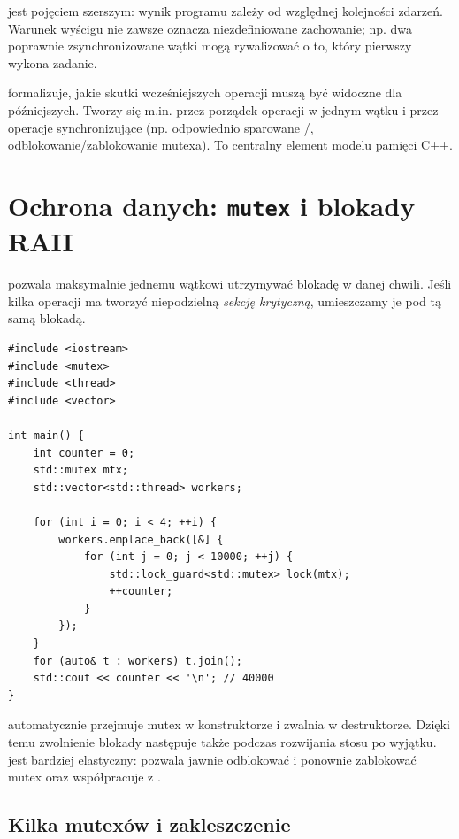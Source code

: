  jest pojęciem szerszym:
wynik programu zależy od względnej kolejności zdarzeń. Warunek wyścigu nie
zawsze oznacza niezdefiniowane zachowanie; np. dwa poprawnie zsynchronizowane
wątki mogą rywalizować o to, który pierwszy wykona zadanie.

 formalizuje, jakie skutki wcześniejszych
operacji muszą być widoczne dla późniejszych. Tworzy się m.in. przez porządek
operacji w jednym wątku i przez operacje synchronizujące (np. odpowiednio
sparowane /, odblokowanie/zablokowanie mutexa).
To centralny element modelu pamięci C++.

\section{Ochrona danych: \texttt{mutex} i blokady RAII}
\label{sec:mutex}

 pozwala maksymalnie jednemu wątkowi utrzymywać blokadę
w danej chwili. Jeśli kilka operacji ma tworzyć niepodzielną \emph{sekcję
krytyczną}, umieszczamy je pod tą samą blokadą.

\begin{lstlisting}[caption={Bezpieczny licznik przy użyciu mutexa (C++11).}]
#include <iostream>
#include <mutex>
#include <thread>
#include <vector>

int main() {
    int counter = 0;
    std::mutex mtx;
    std::vector<std::thread> workers;

    for (int i = 0; i < 4; ++i) {
        workers.emplace_back([&] {
            for (int j = 0; j < 10000; ++j) {
                std::lock_guard<std::mutex> lock(mtx);
                ++counter;
            }
        });
    }
    for (auto& t : workers) t.join();
    std::cout << counter << '\n'; // 40000
}
\end{lstlisting}

 automatycznie przejmuje mutex w konstruktorze i zwalnia
w destruktorze. Dzięki temu zwolnienie blokady następuje także podczas
rozwijania stosu po wyjątku.  jest bardziej elastyczny:
pozwala jawnie odblokować i ponownie zablokować mutex oraz współpracuje
z .

\subsection{Kilka mutexów i zakleszczenie}

